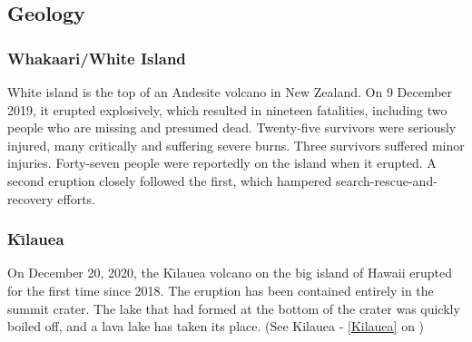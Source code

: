 		\subsection{Geology}
			\subsubsection{Whakaari/White Island}
			White island is the top of an Andesite volcano in New Zealand.  On 9 December 2019, it erupted explosively, which resulted in nineteen fatalities, including two people who are missing and presumed dead. Twenty-five survivors were seriously injured, many critically and suffering severe burns. Three survivors suffered minor injuries. Forty-seven people were reportedly on the island when it erupted. A second eruption closely followed the first, which hampered search-rescue-and-recovery efforts. 
			
			\subsubsection{K\={\i}lauea}
			On December 20, 2020, the K\={\i}lauea volcano on the big island of Hawaii erupted for the first time since 2018.  The eruption has been contained entirely in the summit crater.  The lake that had formed at the bottom of the crater was quickly boiled off, and a lava lake has taken its place.  (See Kilauea - \ref{Kilauea} on )
			
		